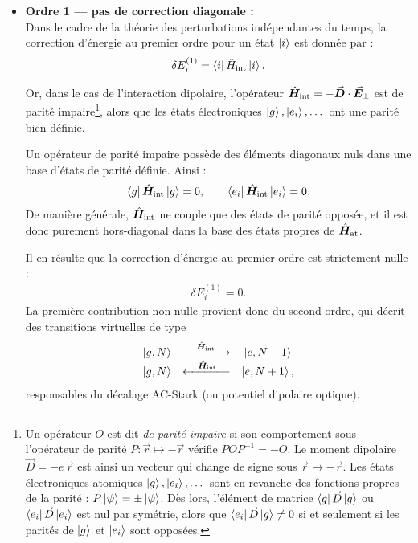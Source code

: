 \begin{itemize}[label = $\bullet$] 
	\item \textbf{Ordre 1 — pas de correction diagonale :}\\ 
	Dans le cadre de la théorie des perturbations indépendantes du temps, 
	la correction d’énergie au premier ordre pour un état \( \ket{i} \) est donnée par :
	\begin{eqnarray}
		\delta E_i^{(1)} = \bra{i} \hat{H}_{\mathrm{int}} \ket{i}.
	\end{eqnarray}

	Or, dans le cas de l’interaction dipolaire, l’opérateur 
	\( \hat{\bm{H}}_{\text{int}} = - \vec{{\bm{D}}} \cdot \vec{{\bm{E}}}_\perp \) 
	est de parité impaire\footnote{
Un opérateur \(O\) est dit \emph{de parité impaire} si son comportement 
sous l’opérateur de parité \(P : \vec{r} \mapsto -\vec{r}\) vérifie 
\( P O P^{-1} = - O \).  
Le moment dipolaire \( \vec{D} = -e\,\vec{r} \) est ainsi un vecteur 
qui change de signe sous \( \vec{r} \to -\vec{r} \).  
Les états électroniques atomiques \( \ket{g}, \ket{e_i}, \dots \) 
sont en revanche des fonctions propres de la parité : 
\( P\ket{\psi} = \pm \ket{\psi} \).  
Dès lors, l’élément de matrice 
\( \bra{g} \vec{D} \ket{g} \) ou \( \bra{e_i} \vec{D} \ket{e_i} \) 
est nul par symétrie, alors que 
\( \bra{e_i} \vec{D} \ket{g} \neq 0 \) 
si et seulement si les parités de \( \ket{g} \) et \( \ket{e_i} \) sont opposées.
}, alors que les états électroniques 
	\( \ket{g}, \ket{e_i}, \dots \) ont une parité bien définie.  

	\medskip

	Un opérateur de parité impaire possède des éléments diagonaux nuls dans une base d’états 
	de parité définie. Ainsi :
	\begin{eqnarray}
		\bra{g} \hat{\bm{H}}_{\text{int}}  \ket{g} = 0, 
		\qquad 
		\bra{e_i} \hat{\bm{H}}_{\text{int}}  \ket{e_i} = 0.
	\end{eqnarray}
	De manière générale, \( \hat{\bm{H}}_{\text{int}} \) ne couple que des états de parité opposée, 
	et il est donc purement hors-diagonal dans la base des états propres de \( \hat{\bm{H}}_{\mathrm{at}} \).  

	\medskip
	Il en résulte que la correction d’énergie au premier ordre est strictement nulle :
	\begin{eqnarray}
		\delta E_i^{(1)} = 0.
	\end{eqnarray}
	La première contribution non nulle provient donc du second ordre, 
	qui décrit des transitions virtuelles de type 
	\begin{eqnarray}
	\begin{array}{ccc}
		\ket{g,N} & \xrightarrow{\quad \hat{\bm{H}}_{\text{int}} \quad}& \ket{e,N-1} \\ 
		\ket{g, N } &  \xleftarrow{\quad \hat{\bm{H}}_{\text{int}} \quad} & \ket{e,N+1}    ,		
	\end{array}		
	\end{eqnarray}
	responsables du décalage AC-Stark (ou potentiel dipolaire optique).\\


\end{itemize}
